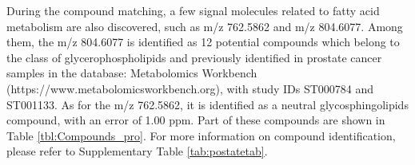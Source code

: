 \documentclass{WileyMSP-template}
\begin{document}
 
During the compound matching, a few signal molecules related to 
fatty acid metabolism are also discovered, such as m/z 762.5862 and m/z 804.6077. 
Among them, the m/z 804.6077 
is identified as 12 potential compounds which belong to the class 
of glycerophospholipids and previously identified in 
prostate cancer samples in the database: 
Metabolomics Workbench (https://www.metabolomicsworkbench.org), 
with study IDs ST000784 and ST001133. 
As for the m/z 762.5862, it is identified as a neutral glycosphingolipids compound, 
with an error of 1.00 ppm. 
Part of these compounds are shown in Table \ref{tbl:Compounds_pro}. 
For more information on compound identification, 
please refer to Supplementary Table \ref{tab:postatetab}. 

\end{document}
